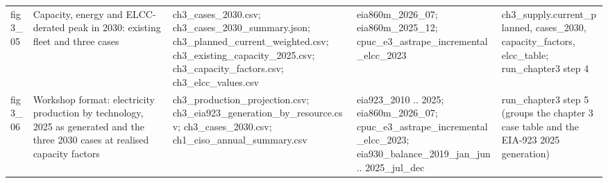 \begin{tabular}{lp{4.6cm}p{5.2cm}p{4.6cm}p{4.8cm}}
fig3\_\allowbreak{}05 & Capacity, energy and ELCC-derated peak in 2030: existing fleet and three cases & ch3\_\allowbreak{}cases\_\allowbreak{}2030.csv; ch3\_\allowbreak{}cases\_\allowbreak{}2030\_\allowbreak{}summary.json; ch3\_\allowbreak{}planned\_\allowbreak{}current\_\allowbreak{}weighted.csv; ch3\_\allowbreak{}existing\_\allowbreak{}capacity\_\allowbreak{}2025.csv; ch3\_\allowbreak{}capacity\_\allowbreak{}factors.csv; ch3\_\allowbreak{}elcc\_\allowbreak{}values.csv & eia860m\_\allowbreak{}2026\_\allowbreak{}07; eia860m\_\allowbreak{}2025\_\allowbreak{}12; cpuc\_\allowbreak{}e3\_\allowbreak{}astrape\_\allowbreak{}incremental\_\allowbreak{}elcc\_\allowbreak{}2023 & ch3\_\allowbreak{}supply.current\_\allowbreak{}planned, cases\_\allowbreak{}2030, capacity\_\allowbreak{}factors, elcc\_\allowbreak{}table; run\_\allowbreak{}chapter3 step 4 \\
fig3\_\allowbreak{}06 & Workshop format: electricity production by technology, 2025 as generated and the three 2030 cases at realised capacity factors & ch3\_\allowbreak{}production\_\allowbreak{}projection.csv; ch3\_\allowbreak{}eia923\_\allowbreak{}generation\_\allowbreak{}by\_\allowbreak{}resource.csv; ch3\_\allowbreak{}cases\_\allowbreak{}2030.csv; ch1\_\allowbreak{}ciso\_\allowbreak{}annual\_\allowbreak{}summary.csv & eia923\_\allowbreak{}2010 .. 2025; eia860m\_\allowbreak{}2026\_\allowbreak{}07; cpuc\_\allowbreak{}e3\_\allowbreak{}astrape\_\allowbreak{}incremental\_\allowbreak{}elcc\_\allowbreak{}2023; eia930\_\allowbreak{}balance\_\allowbreak{}2019\_\allowbreak{}jan\_\allowbreak{}jun .. 2025\_\allowbreak{}jul\_\allowbreak{}dec & run\_\allowbreak{}chapter3 step 5 (groups the chapter 3 case table and the EIA-923 2025 generation) \\
\bottomrule
\end{tabular}